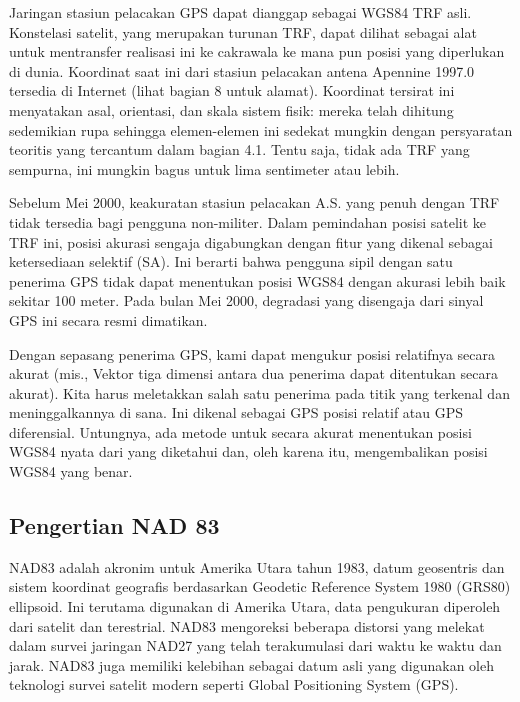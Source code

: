 Jaringan stasiun pelacakan GPS dapat dianggap sebagai WGS84 TRF asli. Konstelasi satelit, yang merupakan turunan TRF, dapat dilihat sebagai alat untuk mentransfer realisasi ini ke cakrawala ke mana pun posisi yang diperlukan di dunia. Koordinat saat ini dari stasiun pelacakan antena Apennine 1997.0 tersedia di Internet (lihat bagian 8 untuk alamat). Koordinat tersirat ini menyatakan asal, orientasi, dan skala sistem fisik: mereka telah dihitung sedemikian rupa sehingga elemen-elemen ini sedekat mungkin dengan persyaratan teoritis yang tercantum dalam bagian 4.1. Tentu saja, tidak ada TRF yang sempurna, ini mungkin bagus untuk lima sentimeter atau lebih.

Sebelum Mei 2000, keakuratan stasiun pelacakan A.S. yang penuh dengan TRF tidak tersedia bagi pengguna non-militer. Dalam pemindahan posisi satelit ke TRF ini, posisi akurasi sengaja digabungkan dengan fitur yang dikenal sebagai ketersediaan selektif (SA). Ini berarti bahwa pengguna sipil dengan satu penerima GPS tidak dapat menentukan posisi WGS84 dengan akurasi lebih baik sekitar 100 meter. Pada bulan Mei 2000, degradasi yang disengaja dari sinyal GPS ini secara resmi dimatikan.

Dengan sepasang penerima GPS, kami dapat mengukur posisi relatifnya secara akurat (mis., Vektor tiga dimensi antara dua penerima dapat ditentukan secara akurat). Kita harus meletakkan salah satu penerima pada titik yang terkenal dan meninggalkannya di sana. Ini dikenal sebagai GPS posisi relatif atau GPS diferensial. Untungnya, ada metode untuk secara akurat menentukan posisi WGS84 nyata dari yang diketahui dan, oleh karena itu, mengembalikan posisi WGS84 yang benar.

\subsection{Pengertian NAD 83}
NAD83 adalah akronim untuk Amerika Utara tahun 1983, datum geosentris dan sistem koordinat geografis berdasarkan Geodetic Reference System 1980 (GRS80) ellipsoid. Ini terutama digunakan di Amerika Utara, data pengukuran diperoleh dari satelit dan terestrial. NAD83 mengoreksi beberapa distorsi yang melekat dalam survei jaringan NAD27 yang telah terakumulasi dari waktu ke waktu dan jarak. NAD83 juga memiliki kelebihan sebagai datum asli yang digunakan oleh teknologi survei satelit modern seperti Global Positioning System (GPS).



